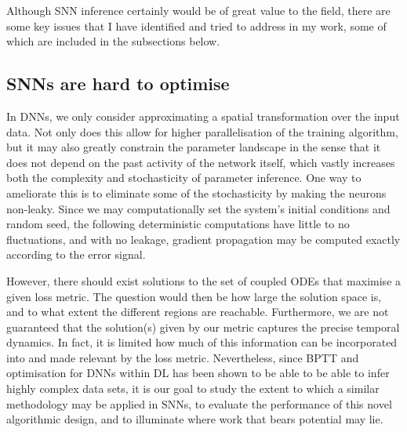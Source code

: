 \documentclass[mphil,deptreport,ianc]{infthesis} %
\begin{document}
Although SNN inference certainly would be of great value to the field, there are some key issues that I have identified and tried to address in my work, some of which are included in the subsections below.

\subsection*{SNNs are hard to optimise}
In DNNs, we only consider approximating a spatial transformation over the input data. Not only does this allow for higher parallelisation of the training algorithm, but it may also greatly constrain the parameter landscape in the sense that it does not depend on the past activity of the network itself, which vastly increases both the complexity and stochasticity of parameter inference. 
One way to ameliorate this is to eliminate some of the stochasticity by making the neurons non-leaky. Since we may computationally set the system’s initial conditions and random seed, the following deterministic computations have little to no fluctuations, and with no leakage, gradient propagation may be computed exactly according to the error signal.

However, there should exist solutions to the set of coupled ODEs that maximise a given loss metric. The question would then be how large the solution space is, and to what extent the different regions are reachable. Furthermore, we are not guaranteed that the solution(s) given by our metric captures the precise temporal dynamics. In fact, it is limited how much of this information can be incorporated into and made relevant by the loss metric.
Nevertheless, since BPTT and optimisation for DNNs within DL has been shown to be able to be able to infer highly complex data sets, it is our goal to study the extent to which a similar methodology may be applied in SNNs, to evaluate the performance of this novel algorithmic design, and to illuminate where work that bears potential may lie.
\end{document}
